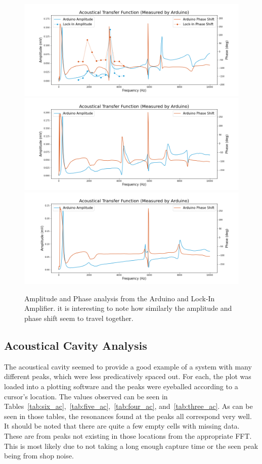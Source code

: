 \documentclass[12pt]{article}
\begin{document}
  
\begin{figure}[!ht]
    \centering
    \includegraphics[width=\textwidth]{arduino data_0}
    \includegraphics[width=\textwidth]{arduino data_1}
    \includegraphics[width=\textwidth]{arduino data_2}
    \caption{Amplitude and Phase analysis from the Arduino and Lock-In Amplifier. it is interesting to note how similarly the amplitude and phase shift seem to travel together.}
    \label{fig:AC_Arduino}
\end{figure} %


\subsection{Acoustical Cavity Analysis}

The acoustical cavity seemed to provide a good example of a system with many different peaks, which were less predicatively spaced out. For each, the plot was loaded into a plotting software and the peaks were eyeballed according to a cursor's location. The values observed can be seen in Tables~\ref{tab:six_ac},~\ref{tab:five_ac},~\ref{tab:four_ac}, and~\ref{tab:three_ac}. As can be seen in those tables, the resonances found at the peaks all correspond very well. It should be noted that there are quite a few empty cells with missing data. These are from peaks not existing in those locations from the appropriate FFT. This is most likely due to not taking a long enough capture time or the seen peak being from shop noise. 
\end{document}
